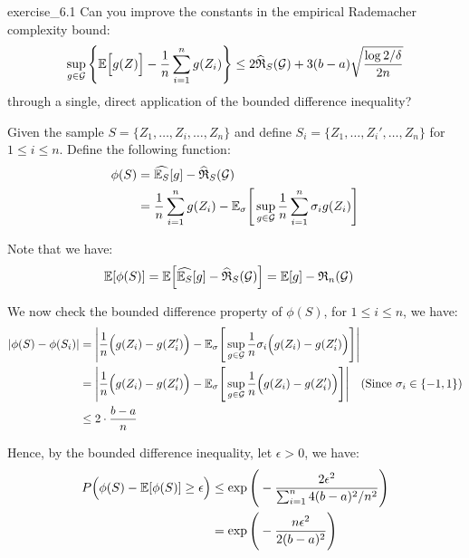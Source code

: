 \begin{exercise}{}{exercise_6.1}
    Can you improve the constants in the empirical Rademacher complexity bound:
    \begin{align*}
        \sup_{g\in\mathcal{G}}\Bigg\{ \mathbb{E}\Big[ g(Z) \Big] - \frac{1}{n}\sum_{i=1}^n g(Z_i) \Bigg\} \le 2\widehat{\mathfrak{R}}_S(\mathcal{G}) + 3(b-a)\sqrt{
            \frac{\log 2/\delta}{2n}
        }
    \end{align*}
    \noindent through a single, direct application of the bounded diﬀerence inequality?
\end{exercise}

\begin{solution*}
    Given the sample $S=\{Z_1, \dots, Z_i, \dots, Z_n \}$ and define $S_i = \{Z_1, \dots, Z_i', \dots, Z_n \}$ for $1\le i \le n$. Define the following function:
    \begin{align*}
        \phi(S) &= \widehat{\mathbb{E}_S}[g] - \widehat{\mathfrak{R}}_S(\mathcal{G}) \\
            &= \frac{1}{n}\sum_{i=1}^n g(Z_i) - \mathbb{E}_\sigma\Bigg[ 
                \sup_{g\in\mathcal{G}}\frac{1}{n} \sum_{i=1}^n \sigma_i g(Z_i)
             \Bigg]
    \end{align*}

    \noindent Note that we have:
    \begin{align*}
        \mathbb{E}[\phi(S)] &= \mathbb{E}\Big[ 
            \widehat{\mathbb{E}_S}[g] - \widehat{\mathfrak{R}}_S(\mathcal{G})
         \Big] = \mathbb{E}[g] - \mathfrak{R}_n(\mathcal{G})
    \end{align*}

    \noindent We now check the bounded difference property of $\phi(S)$, for $1\le i \le n$, we have:
    \begin{align*}
        |\phi(S) - \phi(S_i)| &= \Bigg| 
            \frac{1}{n}\Big( g(Z_i) - g(Z_i') \Big) - \mathbb{E}_\sigma\Bigg[ 
                \sup_{g\in\mathcal{G}} \frac{1}{n}\sigma_i\Big( g(Z_i) - g(Z_i') \Big)
             \Bigg]
         \Bigg| \\
        &= \Bigg| 
            \frac{1}{n}\Big( g(Z_i) - g(Z_i') \Big) - \mathbb{E}_\sigma\Bigg[ 
                \sup_{g\in\mathcal{G}} \frac{1}{n}\Big( g(Z_i) - g(Z_i') \Big)
             \Bigg]
         \Bigg| \ \ \ (\text{Since $\sigma_i\in\{-1, 1\}$}) \\
        &\le 2\cdot\frac{b-a}{n}
    \end{align*}

    \noindent Hence, by the bounded difference inequality, let $\epsilon > 0$, we have:
    \begin{align*}
        P\Big( 
            \phi(S) - \mathbb{E}[\phi(S)] \ge \epsilon
         \Big) &\le \exp\Bigg( 
            -\frac{2\epsilon^2}{\sum_{i=1}^n 4(b-a)^2/n^2}
         \Bigg) \\
        &= \exp\Bigg( 
            -\frac{n\epsilon^2}{2(b-a)^2}
         \Bigg)
    \end{align*}


\end{solution*}
